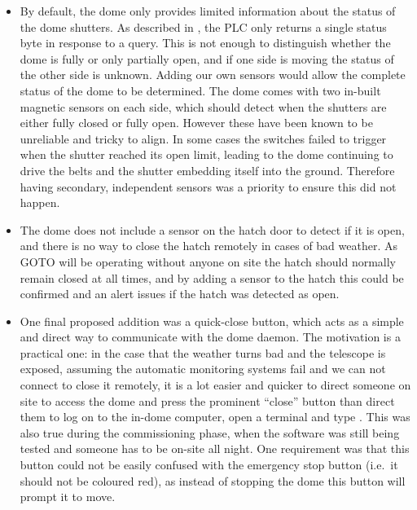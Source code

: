 \begin{colsection}
\begin{colsection}
\begin{itemize}
    \item By default, the dome  only provides limited information about the status of the dome shutters. As described in , the PLC only returns a single status byte in response to a query. This is not enough to distinguish whether the dome is fully or only partially open, and if one side is moving the status of the other side is unknown. Adding our own sensors would allow the complete status of the dome to be determined. The dome comes with two in-built magnetic sensors on each side, which should detect when the shutters are either fully closed or fully open. However these have been known to be unreliable and tricky to align. In some cases the switches failed to trigger when the shutter reached its open limit, leading to the dome continuing to drive the belts and the shutter embedding itself into the ground. Therefore having secondary, independent sensors was a priority to ensure this did not happen.
    \item The dome does not include a sensor on the hatch door to detect if it is open, and there is no way to close the hatch remotely in cases of bad weather. As GOTO will be operating without anyone on site the hatch should normally remain closed at all times, and by adding a sensor to the hatch this could be confirmed and an alert issues if the hatch was detected as open.
    \item One final proposed addition was a quick-close button, which acts as a simple and direct way to communicate with the dome daemon. The motivation is a practical one: in the case that the weather turns bad and the telescope is exposed, assuming the automatic monitoring systems fail and we can not connect to close it remotely, it is a lot easier and quicker to direct someone on site to access the dome and press the prominent ``close'' button than direct them to log on to the in-dome computer, open a terminal and type . This was also true during the commissioning phase, when the software was still being tested and someone has to be on-site all night. One requirement was that this button could not be easily confused with the emergency stop button (i.e.\ it should not be coloured red), as instead of stopping the dome this button will prompt it to move.
\end{itemize}


\end{colsection}
\end{colsection}
